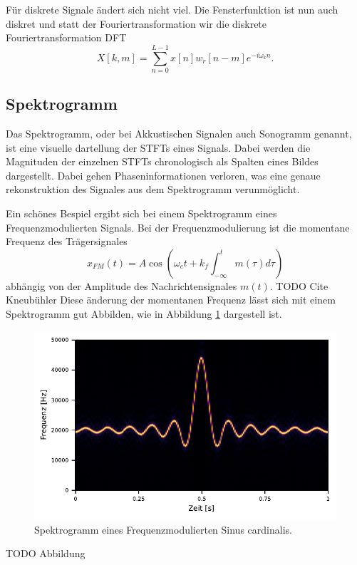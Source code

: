 Für diskrete Signale ändert sich nicht viel.
Die Fensterfunktion ist nun auch diskret und statt
der Fouriertransformation wir die diskrete Fouriertransformation DFT
\begin{equation}
    X[k, m] = \sum_{n = 0}^{L - 1} x[n] w_r[n-m] e^{ -i \omega_k n}.
\end{equation}
\subsection{Spektrogramm}

Das Spektrogramm, oder bei Akkustischen Signalen auch Sonogramm genannt, ist eine visuelle
dartellung der STFTs eines Signals. 
Dabei werden die Magnituden der einzelnen STFTs chronologisch
als Spalten eines Bildes dargestellt.
Dabei gehen Phaseninformationen verloren, was eine genaue rekonstruktion
des Signales aus dem Spektrogramm verunmöglicht.

Ein schönes Bespiel ergibt sich bei einem Spektrogramm eines Frequenzmodulierten 
Signals.
Bei der Frequenzmodulierung ist die momentane Frequenz des Trägersignales 
\begin{equation}
    x_{FM}(t) = A \cos\left( \omega_c t + k_f \int_{-\infty}^{t} m(\tau) d\tau\right)
\end{equation}
abhängig von der Amplitude des Nachrichtensignales $m(t)$.
TODO Cite Kneubühler
Diese änderung der momentanen Frequenz lässt sich mit einem Spektrogramm gut Abbilden, 
wie in Abbildung \ref{sonogramm:fmsono} dargestell ist.
\begin{figure}
    \centering
    \includegraphics{papers/sonogramm/images/fm_sono_windows.pdf}
    \caption{Spektrogramm eines Frequenzmodulierten Sinus cardinalis.
    \label{sonogramm:fmsono}
    }
\end{figure}
TODO Abbildung
